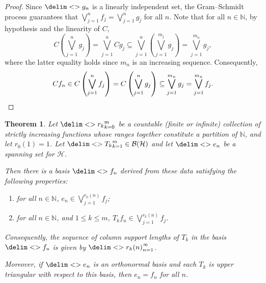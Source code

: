 \documentclass[10pt,reqno]{amsart}
\newtheorem{theorem}{Theorem}[section]
\theoremstyle{remark}
\newcommand{\BH}{\mathcal{B}(\Hil)}
\newcommand{\Hil}{\mathcal{H}}
\newcommand{\seq}{\delim<>}
\numberwithin{equation}{section}
\begin{document}
\begin{proof}
  Since $\seq{g_n}$ is a linearly independent set, the Gram--Schmidt process guarantees that $\bigvee_{j=1}^n f_j = \bigvee_{j=1}^n g_j$ for all $n$.
  Note that for all $n \in \mathbb{N}$, by hypothesis and the linearity of $C$,
  \begin{equation*}
    C \left( \bigvee_{j=1}^n g_j \right) = \bigvee_{j=1}^n Cg_j \subseteq \bigvee_{j=1}^n \left(\bigvee_{j=1}^{m_j} g_j \right) = \bigvee_{j=1}^{m_n} g_j,
  \end{equation*}
  where the latter equality holds since $m_n$ is an increasing sequence.
  Consequently,
  \begin{equation*}
    Cf_n \in C \left( \bigvee_{j=1}^n f_j \right) = C \left( \bigvee_{j=1}^n g_j \right) \subseteq \bigvee_{j=1}^{m_n} g_j = \bigvee_{j=1}^{m_n} f_j. \qedhere
  \end{equation*}
\end{proof}

\begin{theorem}
  \label{thm:arbitrary-staircase-forms}
  Let $\seq{r_k}_{k=0}^m$ be a countable (finite or infinite) collection of strictly increasing functions whose ranges together constitute a partition of $\mathbb{N}$, and let $r_0(1) = 1$.
  Let $\seq{T_k}_{k=1}^m \in \BH$ and let $\seq{e_n}$ be a spanning set for $\Hil$.

  Then there is a basis $\seq{f_n}$ derived from these data satisfying the following properties:
  \begin{enumerate}
  \item for all $n \in \mathbb{N}$, $e_n \in \bigvee_{j=1}^{r_0(n)} f_j$;
  \item for all $n \in \mathbb{N}$, and $1 \le k \le m$, $T_k f_n \in \bigvee_{j=1}^{r_k(n)} f_j$.
  \end{enumerate}
  Consequently, the sequence of column support lengths of $T_k$ in the basis $\seq{f_n}$ is given by $\seq{r_k(n)}_{n=1}^{\infty}$.

  Moreover, if $\seq{e_n}$ is an orthonormal basis and each $T_k$ is upper triangular with respect to this basis, then $e_n = f_n$ for all $n$.
\end{theorem}
\end{document}
